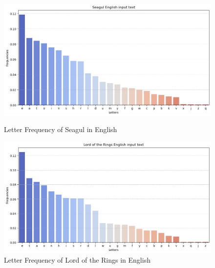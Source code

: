 \begin{figure}[htbp]
    \centering
    \begin{minipage}[b]{0.45\textwidth}
        \centering
        \includegraphics[width=\textwidth]{media/seagulEnglish.png} 
        \caption{Letter Frequency of Seagul in English}
    \end{minipage}
    \hfill
    \begin{minipage}[b]{0.45\textwidth}
        \centering
        \includegraphics[width=\textwidth]{media/lordOfTheRingsEnglish.png}
        \caption{Letter Frequency of Lord of the Rings in English}
    \end{minipage}
\end{figure}


